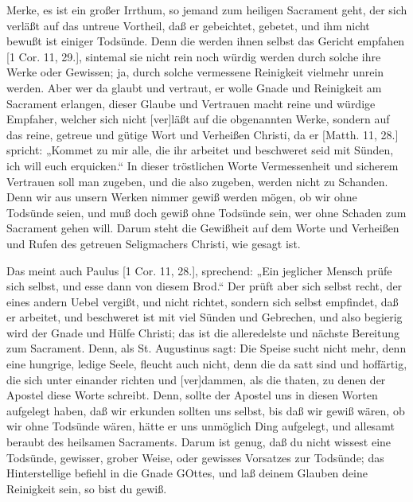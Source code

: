 Merke, es ist ein großer Irrthum, so jemand zum heiligen Sacrament geht, der sich verläßt auf das untreue Vortheil, daß er gebeichtet, gebetet, und ihm nicht bewußt ist einiger Todsünde. Denn die werden ihnen selbst das Gericht empfahen [1 Cor. 11, 29.], sintemal sie nicht rein noch würdig werden durch solche ihre Werke oder Gewissen; ja, durch solche vermessene Reinigkeit vielmehr unrein werden. Aber wer da glaubt und vertraut, er wolle Gnade und Reinigkeit am Sacrament erlangen, dieser Glaube und Vertrauen macht reine und würdige Empfaher, welcher sich nicht [ver]läßt auf die obgenannten Werke, sondern auf das reine, getreue und gütige Wort und Verheißen Christi, da er [Matth. 11, 28.] spricht: „Kommet zu mir alle, die ihr arbeitet und beschweret seid mit Sünden, ich will euch erquicken.“ In dieser tröstlichen Worte Vermessenheit und sicherem Vertrauen soll man zugeben, und die also zugeben, werden nicht zu Schanden. Denn wir aus unsern Werken nimmer gewiß werden mögen, ob wir ohne Todsünde seien, und muß doch gewiß ohne Todsünde sein, wer ohne Schaden zum Sacrament gehen will. Darum steht die Gewißheit auf dem Worte und Verheißen und Rufen des getreuen Seligmachers Christi, wie gesagt ist.

Das meint auch Paulus [1 Cor. 11, 28.], sprechend: „Ein jeglicher Mensch prüfe sich selbst, und esse dann von diesem Brod.“ Der prüft aber sich selbst recht, der eines andern Uebel vergißt, und nicht richtet, sondern sich selbst empfindet, daß er arbeitet, und beschweret ist mit viel Sünden und Gebrechen, und also begierig wird der Gnade und Hülfe Christi; das ist die alleredelste und nächste Bereitung zum Sacrament. Denn, als St. Augustinus sagt: Die Speise sucht nicht mehr, denn eine hungrige, ledige Seele, fleucht auch nicht, denn die da satt sind und hoffärtig, die sich unter einander richten und [ver]dammen, als die thaten, zu denen der Apostel diese Worte schreibt. Denn, sollte der Apostel uns in diesen Worten aufgelegt haben, daß wir erkunden sollten uns selbst, bis daß wir gewiß wären, ob wir ohne Todsünde wären, hätte er uns unmöglich Ding aufgelegt, und allesamt beraubt des heilsamen Sacraments. Darum ist genug, daß du nicht wissest eine Todsünde, gewisser, grober Weise, oder gewisses Vorsatzes zur Todsünde; das Hinterstellige befiehl in die Gnade GOttes, und laß deinem Glauben deine Reinigkeit sein, so bist du gewiß.

